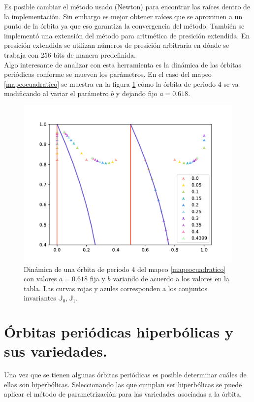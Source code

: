 Es posible cambiar el m\'etodo usado (Newton) para encontrar las ra\'ices dentro de la implementaci\'on. Sin embargo es mejor obtener ra\'ices que se aproximen a un punto de la \'orbita  ya que eso garantiza la convergencia del m\'etodo. Tambi\'en se implement\'o una extensi\'on del m\'etodo para aritm\'etica de presici\'on extendida. En presici\'on extendida se utilizan n\'umeros de presici\'on arbitraria en d\'onde se trabaja con 256 bits de manera predefinida. \\

Algo interesante de analizar con esta herramienta es la din\'amica de las \'orbitas peri\'odicas conforme se mueven los par\'ametros. En el caso del mapeo \eqref{mapeocuadratico} se muestra en la figura  \ref{grafmapeocuadraper4variable} c\'omo la \'orbita de periodo 4 se va modificando al variar el par\'ametro $b$ y dejando fijo $a=0.618$.

\begin{figure}[H]
	\centering
	\includegraphics[scale=0.7]{MapeoCuadraP5b}
	\caption{Din\'amica de una \'orbita de periodo 4 del mapeo \eqref{mapeocuadratico} con valores $a=0.618$ fija y $b$ variando de acuerdo a los valores en la tabla. Las curvas rojas y azules corresponden a los conjuntos invariantes $\mathbb{J}_{0}, \mathbb{J}_{1}$. }
	\label{grafmapeocuadraper4variable}
\end{figure}

\section{\'Orbitas peri\'odicas hiperb\'olicas y sus variedades.}
Una vez que se tienen algunas \'orbitas peri\'odicas es posible determinar cu\'ales de ellas son hiperb\'olicas. Seleccionando las que cumplan ser hiperb\'olicas se puede aplicar el m\'etodo de parametrizaci\'on para las variedades asociadas a la \'orbita. \\

